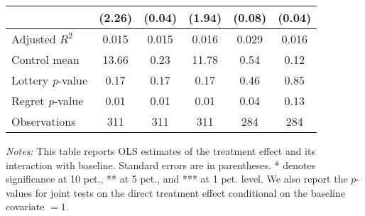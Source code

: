 \begin{table}[h]
{\begin{threeparttable}
\begin{tabular}{l*{5}{c}}
                &   (2.26)         &   (0.04)         &   (1.94)         &   (0.08)         &   (0.04)         \\
\midrule
Adjusted \(R^{2}\)&    0.015         &    0.015         &    0.016         &    0.029         &    0.016         \\
Control mean    &    13.66         &     0.23         &    11.78         &     0.54         &     0.12         \\
Lottery \emph{p}-value&     0.17         &     0.17         &     0.17         &     0.46         &     0.85         \\
Regret \emph{p}-value&     0.01         &     0.01         &     0.01         &     0.04         &     0.13         \\
Observations    &      311         &      311         &      311         &      284         &      284         \\
\bottomrule \end{tabular} \begin{tablenotes}[flushleft] \footnotesize \item \emph{Notes:} This table reports OLS estimates of the treatment effect and its interaction with baseline. Standard errors are in parentheses. * denotes significance at 10 pct., ** at 5 pct., and *** at 1 pct. level. We also report the \(p\)-values for joint tests on the direct treatment effect conditional on the baseline covariate $= 1$. \end{tablenotes} \end{threeparttable} } \end{table}

